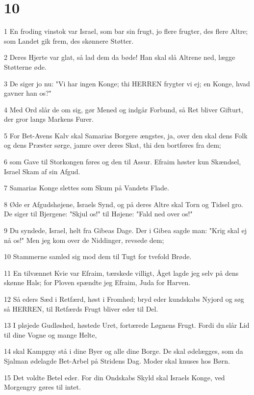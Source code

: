 \chapter{10}

\par 1 En froding vinstok var Israel, som bar sin frugt, jo flere frugter, des flere Altre; som Landet gik frem, des skønnere Støtter.
\par 2 Deres Hjerte var glat, så lad dem da bøde! Han skal slå Altrene ned, lægge Støtterne øde.
\par 3 De siger jo nu: "Vi har ingen Konge; thi HERREN frygter vi ej; en Konge, hvad gavner han os?"
\par 4 Med Ord slår de om sig, gør Mened og indgår Forbund, så Ret bliver Gifturt, der gror langs Markens Furer.
\par 5 For Bet-Avens Kalv skal Samarias Borgere ængstes, ja, over den skal dens Folk og dens Præster sørge, jamre over deres Skat, thi den bortføres fra dem;
\par 6 som Gave til Storkongen føres og den til Assur. Efraim høster kun Skændsel, Israel Skam af sin Afgud.
\par 7 Samarias Konge slettes som Skum på Vandets Flade.
\par 8 Øde er Afgudshøjene, Israels Synd, og på deres Altre skal Torn og Tidsel gro. De siger til Bjergene: "Skjul os!" til Højene: "Fald ned over os!"
\par 9 Du syndede, Israel, helt fra Gibeas Dage. Der i Gibea sagde man: "Krig skal ej nå os!" Men jeg kom over de Niddinger, revsede dem;
\par 10 Stammerne samled sig mod dem til Tugt for tvefold Brøde.
\par 11 En tilvænnet Kvie var Efraim, tærskede villigt, Åget lagde jeg selv på dens skønne Hals; for Ploven spændte jeg Efraim, Juda for Harven.
\par 12 Så eders Sæd i Retfærd, høst i Fromhed; bryd eder kundskabs Nyjord og søg så HERREN, til Retfærds Frugt bliver eder til Del.
\par 13 I pløjede Gudløshed, høstede Uret, fortærede Løgnens Frugt. Fordi du slår Lid til dine Vogne og mange Helte,
\par 14 skal Kampgny stå i dine Byer og alle dine Borge. De skal ødelægges, som da Sjalman ødelagde Bet-Arbel på Stridens Dag. Moder skal knuses hos Børn.
\par 15 Det voldte Betel eder. For din Ondskabs Skyld skal Israels Konge, ved Morgengry gøres til intet.

